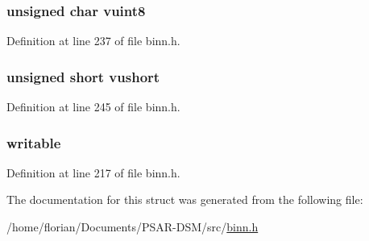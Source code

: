 \subsubsection[{\texorpdfstring{vuint8}{vuint8}}]{\setlength{\rightskip}{0pt plus 5cm}unsigned char vuint8}\hypertarget{structbinn__struct_a2ffdca20463b289153fd0ee50b19a8b9}{}\label{structbinn__struct_a2ffdca20463b289153fd0ee50b19a8b9}


Definition at line 237 of file binn.\+h.

\subsubsection[{\texorpdfstring{vushort}{vushort}}]{\setlength{\rightskip}{0pt plus 5cm}unsigned short vushort}\hypertarget{structbinn__struct_a78b2ce90659fb23f558e6f1d6875b466}{}\label{structbinn__struct_a78b2ce90659fb23f558e6f1d6875b466}


Definition at line 245 of file binn.\+h.

\subsubsection[{\texorpdfstring{writable}{writable}}]{ writable}\hypertarget{structbinn__struct_a73ec689e25e4a578a01fbb1dbcff0495}{}\label{structbinn__struct_a73ec689e25e4a578a01fbb1dbcff0495}


Definition at line 217 of file binn.\+h.



The documentation for this struct was generated from the following file\+:\begin{DoxyCompactItemize}
\item 
/home/florian/\+Documents/\+P\+S\+A\+R-\/\+D\+S\+M/src/\hyperlink{binn_8h}{binn.\+h}\end{DoxyCompactItemize}
